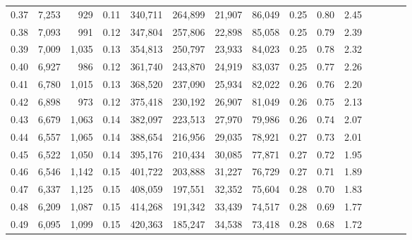 \begin{tabular}{rrrcrrrrrrrrrrr}
0.37 &   7,253 &     929 &                                       0.11 &  340,711 &  264,899 &   21,907 &   86,049 &  0.25 &  0.80 &                         2.45 \\
0.38 &   7,093 &     991 &                                       0.12 &  347,804 &  257,806 &   22,898 &   85,058 &  0.25 &  0.79 &                         2.39 \\
0.39 &   7,009 &   1,035 &                                       0.13 &  354,813 &  250,797 &   23,933 &   84,023 &  0.25 &  0.78 &                         2.32 \\
0.40 &   6,927 &     986 &                                       0.12 &  361,740 &  243,870 &   24,919 &   83,037 &  0.25 &  0.77 &                         2.26 \\
0.41 &   6,780 &   1,015 &                                       0.13 &  368,520 &  237,090 &   25,934 &   82,022 &  0.26 &  0.76 &                         2.20 \\
0.42 &   6,898 &     973 &                                       0.12 &  375,418 &  230,192 &   26,907 &   81,049 &  0.26 &  0.75 &                         2.13 \\
0.43 &   6,679 &   1,063 &                                       0.14 &  382,097 &  223,513 &   27,970 &   79,986 &  0.26 &  0.74 &                         2.07 \\
0.44 &   6,557 &   1,065 &                                       0.14 &  388,654 &  216,956 &   29,035 &   78,921 &  0.27 &  0.73 &                         2.01 \\
0.45 &   6,522 &   1,050 &                                       0.14 &  395,176 &  210,434 &   30,085 &   77,871 &  0.27 &  0.72 &                         1.95 \\
0.46 &   6,546 &   1,142 &                                       0.15 &  401,722 &  203,888 &   31,227 &   76,729 &  0.27 &  0.71 &                         1.89 \\
0.47 &   6,337 &   1,125 &                                       0.15 &  408,059 &  197,551 &   32,352 &   75,604 &  0.28 &  0.70 &                         1.83 \\
0.48 &   6,209 &   1,087 &                                       0.15 &  414,268 &  191,342 &   33,439 &   74,517 &  0.28 &  0.69 &                         1.77 \\
0.49 &   6,095 &   1,099 &                                       0.15 &  420,363 &  185,247 &   34,538 &   73,418 &  0.28 &  0.68 &                         1.72 \\

\end{tabular}
